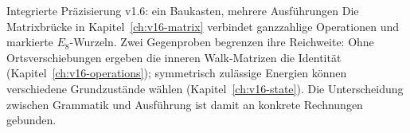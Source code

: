 \begin{bild}{Integrierte Präzisierung v1.6: ein Baukasten, mehrere Ausführungen}
Die Matrixbrücke in Kapitel~\ref{ch:v16-matrix} verbindet ganzzahlige Operationen und markierte $E_8$-Wurzeln. Zwei Gegenproben begrenzen ihre Reichweite: Ohne Ortsverschiebungen ergeben die inneren Walk-Matrizen die Identität (Kapitel~\ref{ch:v16-operations}); symmetrisch zulässige Energien können verschiedene Grundzustände wählen (Kapitel~\ref{ch:v16-state}). Die Unterscheidung zwischen Grammatik und Ausführung ist damit an konkrete Rechnungen gebunden.
\end{bild}
